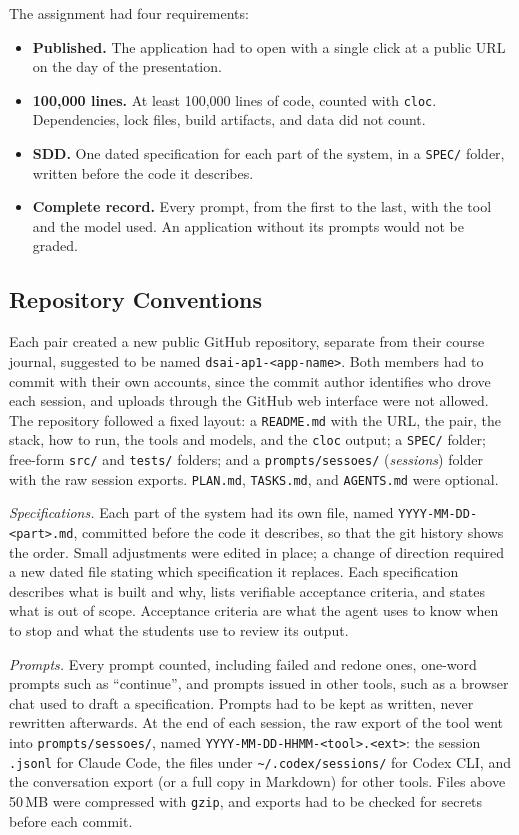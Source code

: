 \documentclass[conference]{IEEEtran}
\begin{document}
The assignment had four requirements:
\begin{itemize}
\item \textbf{Published.} The application had to open with a single click at a public URL on the day of the presentation.
\item \textbf{100,000 lines.} At least 100,000 lines of code, counted with \texttt{cloc}. Dependencies, lock files, build artifacts, and data did not count.
\item \textbf{SDD.} One dated specification for each part of the system, in a \texttt{SPEC/} folder, written before the code it describes.
\item \textbf{Complete record.} Every prompt, from the first to the last, with the tool and the model used. An application without its prompts would not be graded.
\end{itemize}

\subsection{Repository Conventions}

Each pair created a new public GitHub repository, separate from their course journal, suggested to be named \texttt{dsai-ap1-<app-name>}. Both members had to commit with their own accounts, since the commit author identifies who drove each session, and uploads through the GitHub web interface were not allowed. The repository followed a fixed layout: a \texttt{README.md} with the URL, the pair, the stack, how to run, the tools and models, and the \texttt{cloc} output; a \texttt{SPEC/} folder; free-form \texttt{src/} and \texttt{tests/} folders; and a \texttt{prompts/sessoes/} (\emph{sessions}) folder with the raw session exports. \texttt{PLAN.md}, \texttt{TASKS.md}, and \texttt{AGENTS.md} were optional.

\emph{Specifications.} Each part of the system had its own file, named \texttt{YYYY-MM-DD-<part>.md}, committed before the code it describes, so that the git history shows the order. Small adjustments were edited in place; a change of direction required a new dated file stating which specification it replaces. Each specification describes what is built and why, lists verifiable acceptance criteria, and states what is out of scope. Acceptance criteria are what the agent uses to know when to stop and what the students use to review its output.

\emph{Prompts.} Every prompt counted, including failed and redone ones, one-word prompts such as ``continue'', and prompts issued in other tools, such as a browser chat used to draft a specification. Prompts had to be kept as written, never rewritten afterwards. At the end of each session, the raw export of the tool went into \texttt{prompts/sessoes/}, named \texttt{YYYY-MM-DD-HHMM-<tool>.<ext>}: the session \texttt{.jsonl} for Claude Code, the files under \texttt{\textasciitilde/.codex/sessions/} for Codex CLI, and the conversation export (or a full copy in Markdown) for other tools. Files above 50\,MB were compressed with \texttt{gzip}, and exports had to be checked for secrets before each commit.
\end{document}
